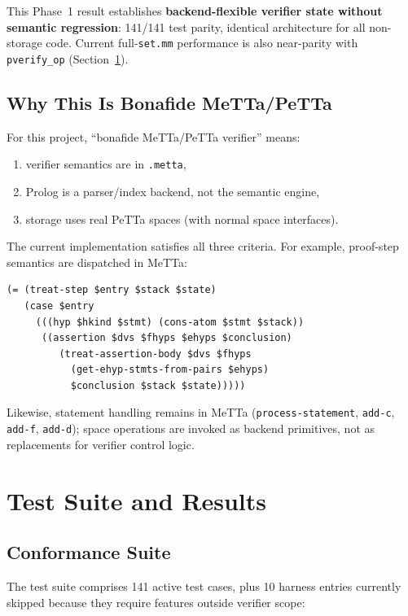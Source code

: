 \documentclass[11pt]{article}
\begin{document}
This Phase~1 result establishes \textbf{backend-flexible
verifier state without semantic regression}: 141/141 test
parity, identical architecture for all non-storage code.
Current full-\texttt{set.mm} performance is also near-parity with
\texttt{pverify\_op} (Section~\ref{sec:results}).

\subsection{Why This Is Bonafide MeTTa/PeTTa}
\label{sec:bonafide}

For this project, ``bonafide MeTTa/PeTTa verifier'' means:
\begin{enumerate}[leftmargin=2em]
  \item verifier semantics are in \texttt{.metta},
  \item Prolog is a parser/index backend, not the semantic engine,
  \item storage uses real PeTTa spaces (with normal space interfaces).
\end{enumerate}

The current implementation satisfies all three criteria.
For example, proof-step semantics are dispatched in MeTTa:
\begin{lstlisting}[language=MeTTa,caption={Semantic proof-step dispatch remains in MeTTa.}]
(= (treat-step $entry $stack $state)
   (case $entry
     (((hyp $hkind $stmt) (cons-atom $stmt $stack))
      ((assertion $dvs $fhyps $ehyps $conclusion)
         (treat-assertion-body $dvs $fhyps
           (get-ehyp-stmts-from-pairs $ehyps)
           $conclusion $stack $state)))))
\end{lstlisting}

Likewise, statement handling remains in MeTTa
(\texttt{process-statement}, \texttt{add-c}, \texttt{add-f},
\texttt{add-d}); space operations are invoked as backend primitives,
not as replacements for verifier control logic.

\section{Test Suite and Results}
\label{sec:results}

\subsection{Conformance Suite}

The test suite comprises 141 active test cases, plus 10 harness
entries currently skipped because they require features outside
verifier scope:
\end{document}
